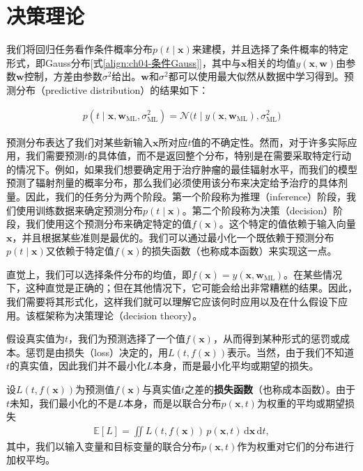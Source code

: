 \documentclass[../../main.tex]{subfiles}
\begin{document}
\section{决策理论}\label{section:ch04-决策理论}

我们将回归任务看作条件概率分布$p(t\mid\boldsymbol{x})$来建模，并且选择了条件概率的特定形式，即Gauss分布[式\eqref{align:ch04-条件Gauss}]，其中与$\boldsymbol{x}$相关的均值$y(\boldsymbol{x},\boldsymbol{w})$由参数$\boldsymbol{w}$控制，方差由参数$\sigma^2$给出。$\boldsymbol{w}$和$\sigma^2$都可以使用最大似然从数据中学习得到。预测分布（predictive distribution）的结果如下：

\begin{align}
  p(t\mid\boldsymbol{x},\boldsymbol{w}_{\mathrm{ML}},\sigma^2_{\mathrm{ML}})=\mathcal{N}\bigl(t\mid y(\boldsymbol{x},\boldsymbol{w}_{\mathrm{ML}}),\sigma^2_{\mathrm{ML}}\bigr)
  \label{align:ch04-预测分布}
\end{align}

预测分布表达了我们对某些新输入$\boldsymbol{x}$所对应$t$值的不确定性。然而，对于许多实际应用，我们需要预测$t$的具体值，而不是返回整个分布，特别是在需要采取特定行动的情况下。例如，如果我们想要确定用于治疗肿瘤的最佳辐射水平，而我们的模型预测了辐射剂量的概率分布，那么我们必须使用该分布来决定给予治疗的具体剂量。因此，我们的任务分为两个阶段。第一个阶段称为推理（inference）阶段，我们使用训练数据来确定预测分布$p(t\mid\boldsymbol{x})$。第二个阶段称为决策（decision）阶段，我们使用这个预测分布来确定特定的值$f(\boldsymbol{x})$。这个特定的值依赖于输入向量$\boldsymbol{x}$，并且根据某些准则是最优的。我们可以通过最小化一个既依赖于预测分布$p(t\mid\boldsymbol{x})$又依赖于特定值$f(\boldsymbol{x})$的损失函数（也称成本函数）来实现这一点。

直觉上，我们可以选择条件分布的均值，即$f(\boldsymbol{x})=y(\boldsymbol{x},\boldsymbol{w}_{\mathrm{ML}})$。在某些情况下，这种直觉是正确的；但在其他情况下，它可能会给出非常糟糕的结果。因此，我们需要将其形式化，这样我们就可以理解它应该何时应用以及在什么假设下应用。该框架称为决策理论（decision theory）。

假设真实值为$t$，我们为预测选择了一个值$f(\boldsymbol{x})$，从而得到某种形式的惩罚或成本。惩罚是由损失（loss）决定的，用$L(t,f(\boldsymbol{x}))$表示。当然，由于我们不知道$t$的真实值，因此我们并不最小化$L$本身，而是最小化平均或期望的损失。

\begin{definition}[损失函数与期望损失]\label{definition:ch04-损失函数}
设$L(t,f(\boldsymbol{x}))$为预测值$f(\boldsymbol{x})$与真实值$t$之差的\textbf{损失函数}（也称成本函数）。由于$t$未知，我们最小化的不是$L$本身，而是以联合分布$p(\boldsymbol{x},t)$为权重的平均或期望损失
\begin{align}
  \mathbb{E}[L]=\iint L(t,f(\boldsymbol{x}))\,p(\boldsymbol{x},t)\,\mathrm{d}\boldsymbol{x}\,\mathrm{d}t,
  \label{align:ch04-期望损失}
\end{align}
其中，我们以输入变量和目标变量的联合分布$p(\boldsymbol{x},t)$作为权重对它们的分布进行加权平均。
\end{definition}
\end{document}
